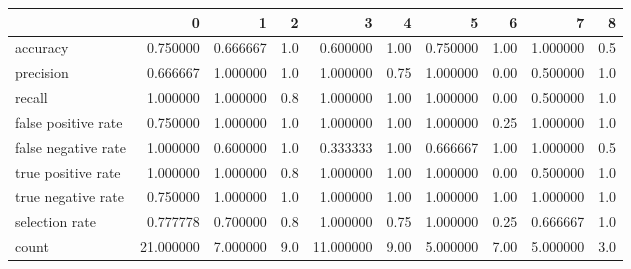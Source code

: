 \begin{tabular}{lrrrrrrrrr}
\toprule
{} &          0 &         1 &    2 &          3 &     4 &         5 &     6 &         7 &    8 \\
\midrule
accuracy            &   0.750000 &  0.666667 &  1.0 &   0.600000 &  1.00 &  0.750000 &  1.00 &  1.000000 &  0.5 \\
precision           &   0.666667 &  1.000000 &  1.0 &   1.000000 &  0.75 &  1.000000 &  0.00 &  0.500000 &  1.0 \\
recall              &   1.000000 &  1.000000 &  0.8 &   1.000000 &  1.00 &  1.000000 &  0.00 &  0.500000 &  1.0 \\
false positive rate &   0.750000 &  1.000000 &  1.0 &   1.000000 &  1.00 &  1.000000 &  0.25 &  1.000000 &  1.0 \\
false negative rate &   1.000000 &  0.600000 &  1.0 &   0.333333 &  1.00 &  0.666667 &  1.00 &  1.000000 &  0.5 \\
true positive rate  &   1.000000 &  1.000000 &  0.8 &   1.000000 &  1.00 &  1.000000 &  0.00 &  0.500000 &  1.0 \\
true negative rate  &   0.750000 &  1.000000 &  1.0 &   1.000000 &  1.00 &  1.000000 &  1.00 &  1.000000 &  1.0 \\
selection rate      &   0.777778 &  0.700000 &  0.8 &   1.000000 &  0.75 &  1.000000 &  0.25 &  0.666667 &  1.0 \\
count               &  21.000000 &  7.000000 &  9.0 &  11.000000 &  9.00 &  5.000000 &  7.00 &  5.000000 &  3.0 \\
\bottomrule
\end{tabular}
